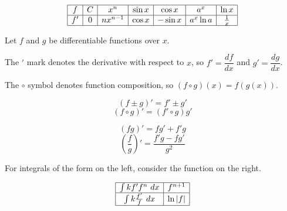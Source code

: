 \documentclass[../main.tex]{subfile}
\begin{document}


{\large\renewcommand{\arraystretch}{1.5}
$$\begin{array}{|*{7}{c|}}
	\hline
	f & C & x^n & \sin x & \cos x & a^x & \ln x \\
	\hline
	f' & 0 & nx^{n-1} & \cos x & -\sin x & a^x\ln a & \frac{1}{x} \\
	\hline
\end{array}$$
}


\vspace{-0.8em}
\begin{center}
Let $f$ and $g$ be differentiable functions over $x$.

The $'$ mark denotes the derivative with respect to $x$, so $f' = \dfrac{df}{dx}$ and $g' = \dfrac{dg}{dx}$.

The $\circ$ symbol denotes function composition, so $(f \circ g)(x) = f(g(x))$.
\end{center}
\vspace{0.5em}

\begin{figure}[h]
{\centering\large
\begin{minipage}{0.49\linewidth}
	$$(f \pm g)' = f' \pm g'$$
	\vspace{0.5em}
	$$(f \circ g)' = (f' \circ g) g'$$
\end{minipage}\hfill
\begin{minipage}{0.49\linewidth}
	$$(fg)' = fg' + f'g$$
	\vspace{0.5em}
	$$\left(\frac{f}{g}\right)' = \frac{f'g - fg'}{g^2}$$
\end{minipage}
}
\end{figure}


\begin{center}
For integrals of the form on the left, consider the function on the right.
\end{center}
\vspace{-1em}

{\large\renewcommand{\arraystretch}{1.8}
$$\begin{array}{|c|c|}
	\hline
	\int k f' f^n \ d x & f^{n + 1} \\
	\hline
	\int k \frac{f'}{f} \ d x & \ln|f| \\
	\hline
\end{array}$$}
\end{document}
